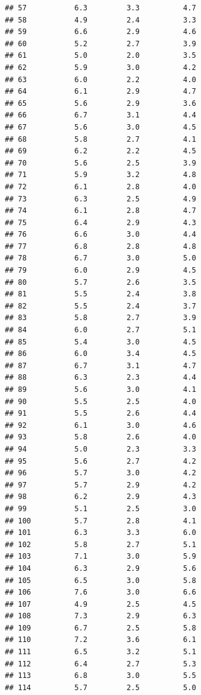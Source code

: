 \documentclass[
]{book}
\begin{document}
\begin{verbatim}
## 57           6.3         3.3          4.7
## 58           4.9         2.4          3.3
## 59           6.6         2.9          4.6
## 60           5.2         2.7          3.9
## 61           5.0         2.0          3.5
## 62           5.9         3.0          4.2
## 63           6.0         2.2          4.0
## 64           6.1         2.9          4.7
## 65           5.6         2.9          3.6
## 66           6.7         3.1          4.4
## 67           5.6         3.0          4.5
## 68           5.8         2.7          4.1
## 69           6.2         2.2          4.5
## 70           5.6         2.5          3.9
## 71           5.9         3.2          4.8
## 72           6.1         2.8          4.0
## 73           6.3         2.5          4.9
## 74           6.1         2.8          4.7
## 75           6.4         2.9          4.3
## 76           6.6         3.0          4.4
## 77           6.8         2.8          4.8
## 78           6.7         3.0          5.0
## 79           6.0         2.9          4.5
## 80           5.7         2.6          3.5
## 81           5.5         2.4          3.8
## 82           5.5         2.4          3.7
## 83           5.8         2.7          3.9
## 84           6.0         2.7          5.1
## 85           5.4         3.0          4.5
## 86           6.0         3.4          4.5
## 87           6.7         3.1          4.7
## 88           6.3         2.3          4.4
## 89           5.6         3.0          4.1
## 90           5.5         2.5          4.0
## 91           5.5         2.6          4.4
## 92           6.1         3.0          4.6
## 93           5.8         2.6          4.0
## 94           5.0         2.3          3.3
## 95           5.6         2.7          4.2
## 96           5.7         3.0          4.2
## 97           5.7         2.9          4.2
## 98           6.2         2.9          4.3
## 99           5.1         2.5          3.0
## 100          5.7         2.8          4.1
## 101          6.3         3.3          6.0
## 102          5.8         2.7          5.1
## 103          7.1         3.0          5.9
## 104          6.3         2.9          5.6
## 105          6.5         3.0          5.8
## 106          7.6         3.0          6.6
## 107          4.9         2.5          4.5
## 108          7.3         2.9          6.3
## 109          6.7         2.5          5.8
## 110          7.2         3.6          6.1
## 111          6.5         3.2          5.1
## 112          6.4         2.7          5.3
## 113          6.8         3.0          5.5
## 114          5.7         2.5          5.0

\end{verbatim}
\end{document}
